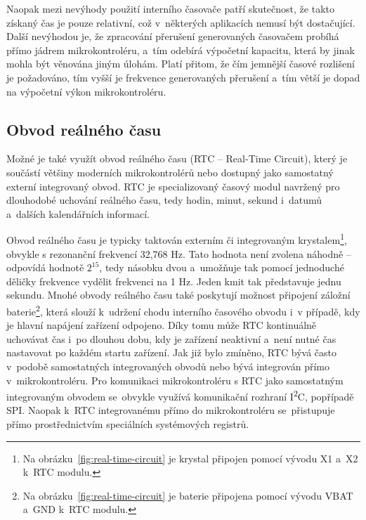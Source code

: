 Naopak mezi nevýhody použití interního časovače patří skutečnost, že takto získaný čas je pouze relativní, což v~některých aplikacích nemusí být dostačující. Další nevýhodou je, že zpracování přerušení generovaných časovačem probíhá přímo jádrem mikrokontroléru, a~tím odebírá výpočetní kapacitu, která by jinak mohla být věnována jiným úlohám. Platí přitom, že čím jemnější časové rozlišení je požadováno, tím vyšší je frekvence generovaných přerušení a~tím větší je dopad na výpočetní výkon mikrokontroléru.~\cite{perny2008zarizeni_cas_znacky}

\subsection{Obvod reálného času}
\label{real_time_circuit}
Možné je také využít obvod reálného času (RTC -- Real-Time Circuit), který je součástí většiny moderních mikrokontrolérů nebo dostupný jako samostatný externí integrovaný obvod. RTC je specializovaný časový modul navržený pro dlouhodobé uchování reálného času, tedy hodin, minut, sekund i~datumů a~dalších kalendářních informací.

Obvod reálného času je typicky taktován externím či integrovaným krystalem\footnote{Na obrázku~\ref{fig:real-time-circuit} je krystal připojen pomocí vývodu X1 a~X2 k~RTC modulu.}, obvykle s rezonanční frekvencí 32,768 Hz. Tato hodnota není zvolena náhodně – odpovídá hodnotě $2^{15}$, tedy násobku dvou a~umožňuje tak pomocí jednoduché děličky frekvence vydělit frekvenci na 1 Hz. Jeden kmit tak představuje jednu sekundu. Mnohé obvody reálného času také poskytují možnost připojení záložní baterie\footnote{Na obrázku~\ref{fig:real-time-circuit} je baterie připojena pomocí vývodu VBAT a~GND k~RTC modulu.}, která slouží k~udržení chodu interního časového obvodu i~v případě, kdy je hlavní napájení zařízení odpojeno. Díky tomu může RTC kontinuálně uchovávat čas i~po dlouhou dobu, kdy je zařízení neaktivní a~není nutné čas nastavovat po každém startu zařízení. Jak již bylo zmíněno, RTC bývá často v~podobě samostatných integrovaných obvodů nebo bývá integrován přímo v~mikrokontroléru. Pro komunikaci mikrokontroléru s RTC jako samostatným integrovaným obvodem se~obvykle využívá komunikační rozhraní I\textsuperscript{2}C, popřípadě SPI. Naopak k~RTC integrovanému přímo do mikrokontroléru se~přistupuje přímo prostřednictvím speciálních systémových registrů.~\cite{jameco_choosing_right_real_time_clock_chip_or_module, yxc_role_of_32768_freq_in_the_circuit, medium_rtc}

